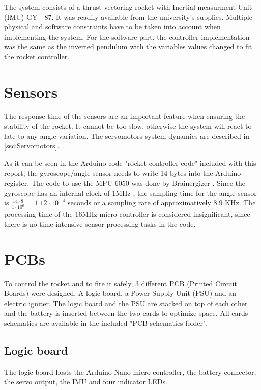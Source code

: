 The system consists of a thrust vectoring rocket with Inertial measurment Unit (IMU) GY - 87. It was readily available from the university's supplies.
Multiple physical and software constraints have to be taken into account when implementing the system. For the software part, the controller implementation was the same as the inverted pendulum with the variables values changed to fit the rocket controller.

\section{Sensors}
The response time of the sensors are an important feature when ensuring the stability of the rocket. It cannot be too slow, otherwise the system will react to late to any angle variation. The servomotors system dynamics are described in \autoref{ssc:Servomotors}.

As it can be seen in the Arduino code "rocket controller code" included with this report, the gyroscope/angle sensor needs to write 14 bytes into the Arduino register. The code to use the MPU 6050 was done by Brainergizer \cite{web:gyro_angle}. Since the gyroscope has an internal clock of 1MHz \cite{datasheet:MPU-6050}, the sampling time for the angle sensor is $\frac{14 \cdot 8}{1 \cdot 10^{6}} = 1.12 \cdot 10^{-4}$ seconds or a sampling rate of approximatively 8.9 KHz. The processing time of the 16MHz micro-controller is considered insignificant, since there is no time-intensive sensor processing tasks in the code.

\section{PCBs}
To control the rocket and to fire it safely, 3 different PCB (Printed Circuit Boards) were designed. A logic board, a Power Supply Unit (PSU) and an electric igniter. The logic board and the PSU are stacked on top of each other and the battery is inserted between the two cards to optimize space. All cards schematics are available in the included "PCB schematics folder".

\subsection{Logic board}
The logic board hosts the Arduino Nano micro-controller, the battery connector, the servo output, the IMU and four indicator LEDs.

